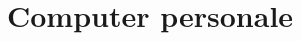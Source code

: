 \documentclass{report}
\begin{document}
    
    
    
    \tableofcontents

    \part{Computer personale}
        
    
\end{document}
